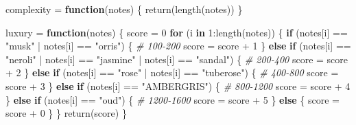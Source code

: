 \documentclass[
]{article}
\newenvironment{Shaded}{\begin{snugshade}}{\end{snugshade}}
\newcommand{\CommentTok}[1]{\textcolor[rgb]{0.56,0.35,0.01}{\textit{#1}}}
\newcommand{\ControlFlowTok}[1]{\textcolor[rgb]{0.13,0.29,0.53}{\textbf{#1}}}
\newcommand{\DecValTok}[1]{\textcolor[rgb]{0.00,0.00,0.81}{#1}}
\newcommand{\FunctionTok}[1]{\textcolor[rgb]{0.00,0.00,0.00}{#1}}
\newcommand{\NormalTok}[1]{#1}
\newcommand{\OtherTok}[1]{\textcolor[rgb]{0.56,0.35,0.01}{#1}}
\newcommand{\SpecialCharTok}[1]{\textcolor[rgb]{0.00,0.00,0.00}{#1}}
\newcommand{\StringTok}[1]{\textcolor[rgb]{0.31,0.60,0.02}{#1}}
\begin{document}
\begin{Shaded}
\begin{Highlighting}[]
\NormalTok{complexity }\OtherTok{=} \ControlFlowTok{function}\NormalTok{(notes) \{}
  \FunctionTok{return}\NormalTok{(}\FunctionTok{length}\NormalTok{(notes))}
\NormalTok{\}}

\NormalTok{luxury }\OtherTok{=} \ControlFlowTok{function}\NormalTok{(notes) \{}
\NormalTok{  score }\OtherTok{=} \DecValTok{0}
  \ControlFlowTok{for}\NormalTok{ (i }\ControlFlowTok{in} \DecValTok{1}\SpecialCharTok{:}\FunctionTok{length}\NormalTok{(notes)) \{}
    \ControlFlowTok{if}\NormalTok{ (notes[i] }\SpecialCharTok{==} \StringTok{"musk"} \SpecialCharTok{|}\NormalTok{ notes[i] }\SpecialCharTok{==} \StringTok{"orris"}\NormalTok{) \{ }\CommentTok{\# 100{-}200}
\NormalTok{      score }\OtherTok{=}\NormalTok{ score }\SpecialCharTok{+} \DecValTok{1}
\NormalTok{    \} }\ControlFlowTok{else} \ControlFlowTok{if}\NormalTok{ (notes[i] }\SpecialCharTok{==} \StringTok{"neroli"} \SpecialCharTok{|}\NormalTok{ notes[i] }\SpecialCharTok{==} \StringTok{"jasmine"} \SpecialCharTok{|}\NormalTok{ notes[i] }\SpecialCharTok{==} \StringTok{"sandal"}\NormalTok{) \{ }\CommentTok{\# 200{-}400}
\NormalTok{      score }\OtherTok{=}\NormalTok{ score }\SpecialCharTok{+} \DecValTok{2}
\NormalTok{    \} }\ControlFlowTok{else} \ControlFlowTok{if}\NormalTok{ (notes[i] }\SpecialCharTok{==} \StringTok{"rose"} \SpecialCharTok{|}\NormalTok{ notes[i] }\SpecialCharTok{==} \StringTok{"tuberose"}\NormalTok{) \{ }\CommentTok{\# 400{-}800}
\NormalTok{      score }\OtherTok{=}\NormalTok{ score }\SpecialCharTok{+} \DecValTok{3}
\NormalTok{    \} }\ControlFlowTok{else} \ControlFlowTok{if}\NormalTok{ (notes[i] }\SpecialCharTok{==} \StringTok{"AMBERGRIS"}\NormalTok{) \{ }\CommentTok{\# 800{-}1200}
\NormalTok{      score }\OtherTok{=}\NormalTok{ score }\SpecialCharTok{+} \DecValTok{4}
\NormalTok{    \} }\ControlFlowTok{else} \ControlFlowTok{if}\NormalTok{ (notes[i] }\SpecialCharTok{==} \StringTok{"oud"}\NormalTok{) \{ }\CommentTok{\# 1200{-}1600}
\NormalTok{      score }\OtherTok{=}\NormalTok{ score }\SpecialCharTok{+} \DecValTok{5}
\NormalTok{    \} }\ControlFlowTok{else}\NormalTok{ \{}
\NormalTok{      score }\OtherTok{=}\NormalTok{ score }\SpecialCharTok{+} \DecValTok{0}
\NormalTok{    \}}
\NormalTok{  \}}
  \FunctionTok{return}\NormalTok{(score)}
\NormalTok{\}}
\end{Highlighting}
\end{Shaded}
\end{document}
